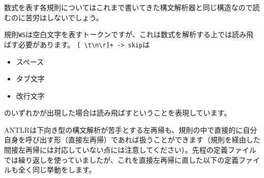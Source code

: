 数式を表す各規則についてはこれまで書いてきた構文解析器と同じ構造なので読むのに苦労はしないでしょう。

規則\texttt{WS}は空白文字を表すトークンですが、これは数式を解析する上では読み飛ばす必要があります。
\texttt{{[}\ \textbackslash{}t\textbackslash{}n\textbackslash{}r{]}+\ -\textgreater{}\ skip}は

\begin{itemize}
\tightlist
\item
  スペース
\item
  タブ文字
\item
  改行文字
\end{itemize}

のいずれかが出現した場合は読み飛ばすということを表現しています。

ANTLRは下向き型の構文解析が苦手とする左再帰も、規則の中で直接的に自分自身を呼び出す形（直接左再帰）であれば扱うことができます（規則を経由した間接左再帰には対応していない点には注意してください）。先程の定義ファイルでは繰り返しを使っていましたが、これを直接左再帰に直した以下の定義ファイルも全く同じ挙動をします。

